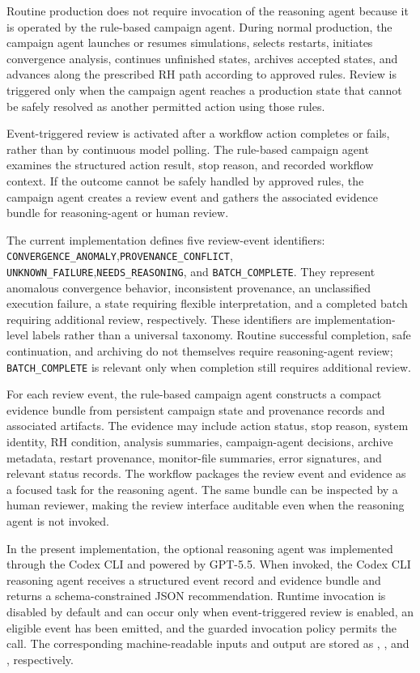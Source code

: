 Routine production does not require invocation of the reasoning agent because it is operated by the rule-based campaign agent. During normal production, the campaign agent launches or resumes simulations, selects restarts, initiates convergence analysis, continues unfinished states, archives accepted states, and advances along the prescribed RH path according to approved rules. Review is triggered only when the campaign agent reaches a production state that cannot be safely resolved as another permitted action using those rules.

Event-triggered review is activated after a workflow action completes or fails, rather than by continuous model polling. The rule-based campaign agent examines the structured action result, stop reason, and recorded workflow context. If the outcome cannot be safely handled by approved rules, the campaign agent creates a review event and gathers the associated evidence bundle for reasoning-agent or human review.

The current implementation defines five review-event identifiers: \texttt{CONVERGENCE\_ANOMALY},\linebreak \texttt{PROVENANCE\_CONFLICT}, \texttt{UNKNOWN\_FAILURE},\linebreak \texttt{NEEDS\_REASONING}, and \texttt{BATCH\_COMPLETE}. They represent anomalous convergence behavior, inconsistent provenance, an unclassified execution failure, a state requiring flexible interpretation, and a completed batch requiring additional review, respectively. These identifiers are implementation-level labels rather than a universal taxonomy. Routine successful completion, safe continuation, and archiving do not themselves require reasoning-agent review; \texttt{BATCH\_COMPLETE} is relevant only when completion still requires additional review.

For each review event, the rule-based campaign agent constructs a compact evidence bundle from persistent campaign state and provenance records and associated artifacts. The evidence may include action status, stop reason, system identity, RH condition, analysis summaries, campaign-agent decisions, archive metadata, restart provenance, monitor-file summaries, error signatures, and relevant status records. The workflow packages the review event and evidence as a focused task for the reasoning agent. The same bundle can be inspected by a human reviewer, making the review interface auditable even when the reasoning agent is not invoked.

In the present implementation, the optional reasoning agent was implemented through the Codex CLI and powered by GPT-5.5. When invoked, the Codex CLI reasoning agent receives a structured event record and evidence bundle and returns a schema-constrained JSON recommendation. Runtime invocation is disabled by default and can occur only when event-triggered review is enabled, an eligible event has been emitted, and the guarded invocation policy permits the call. The corresponding machine-readable inputs and output are stored as , , and , respectively.

